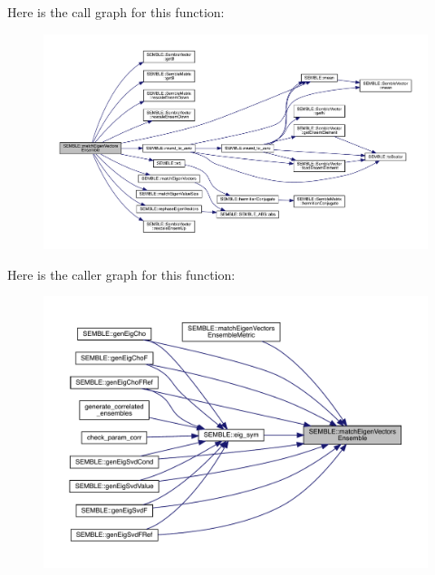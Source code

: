 Here is the call graph for this function\+:
\nopagebreak
\begin{figure}[H]
\begin{center}
\leavevmode
\includegraphics[width=350pt]{d7/dfd/namespaceSEMBLE_ad0d009c5dcbf4da0e2270b14f667ee70_cgraph}
\end{center}
\end{figure}
Here is the caller graph for this function\+:
\nopagebreak
\begin{figure}[H]
\begin{center}
\leavevmode
\includegraphics[width=350pt]{d7/dfd/namespaceSEMBLE_ad0d009c5dcbf4da0e2270b14f667ee70_icgraph}
\end{center}
\end{figure}
\mbox{\label{namespaceSEMBLE_ad6ce16294510dbd0badf0aa5cdbacbd6}} 
